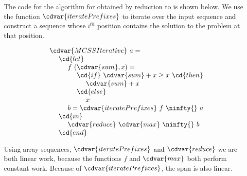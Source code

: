 \begin{algorithm}
\label{alg:mcs::iterative}
The \PML code for the algorithm for \MCSS{} obtained by reduction to
\MCSSE{} is shown below.
%
%
We use the function $\cdvar{iteratePrefixes}$ to iterate over the input
sequence and construct a sequence whose $i^{th}$ position contains the
solution to the \MCSSE{} problem at that position.

\[
\begin{array}{l}
\cdvar{MCSSIterative}~a = 
\\
~~~~\cd{let}
\\ 
~~~~~~~~f~(\cdvar{sum},x) =
\\
~~~~~~~~~~~~\cd{if}~\cdvar{sum} + x \ge x~\cd{then}
\\ 
~~~~~~~~~~~~~~~~\cdvar{sum} + x
\\
~~~~~~~~~~~~\cd{else}
\\
~~~~~~~~~~~~~~~~x
\\ 
~~~~~~~~b = \cdvar{iteratePrefixes}~f~\ninfty{}~a
\\
~~~~\cd{in}
\\
~~~~~~~~\cdvar{reduce}~\cdvar{max}~\ninfty{}~b
\\
~~~~\cd{end}
\end{array}
\] 
\end{algorithm}

\begin{gram}
Using array sequences, $\cdvar{iteratePrefixes}$ and $\cdvar{reduce}$
we are both linear work, because the functions $f$ and $\cdvar{max}$
both perform constant work. 
%
Because of $\cdvar{iteratePrefixes}$, the span is also linear.
\end{gram}







\begin{gram}
\label{gr:mcss::reduction:mcsse::optimal-reduction::intution}


%
\end{gram}


